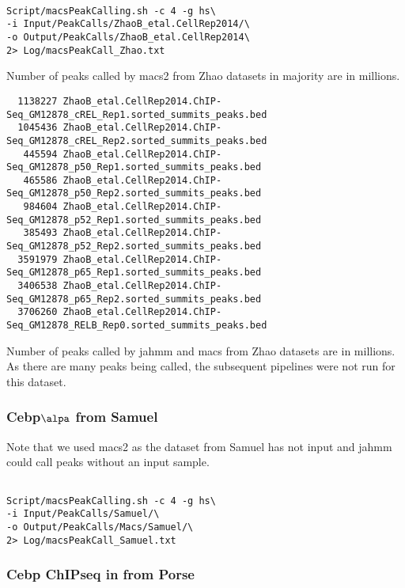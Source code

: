 \documentclass{article}\usepackage[]{graphicx}\usepackage[]{color}
\begin{document}
\begin{verbatim}

Script/macsPeakCalling.sh -c 4 -g hs\ 
-i Input/PeakCalls/ZhaoB_etal.CellRep2014/\
-o Output/PeakCalls/ZhaoB_etal.CellRep2014\ 
2> Log/macsPeakCall_Zhao.txt

\end{verbatim}

Number of peaks called by macs2 from Zhao datasets in majority are in millions. 
\begin{verbatim}
  1138227 ZhaoB_etal.CellRep2014.ChIP-Seq_GM12878_cREL_Rep1.sorted_summits_peaks.bed
  1045436 ZhaoB_etal.CellRep2014.ChIP-Seq_GM12878_cREL_Rep2.sorted_summits_peaks.bed
   445594 ZhaoB_etal.CellRep2014.ChIP-Seq_GM12878_p50_Rep1.sorted_summits_peaks.bed
   465586 ZhaoB_etal.CellRep2014.ChIP-Seq_GM12878_p50_Rep2.sorted_summits_peaks.bed
   984604 ZhaoB_etal.CellRep2014.ChIP-Seq_GM12878_p52_Rep1.sorted_summits_peaks.bed
   385493 ZhaoB_etal.CellRep2014.ChIP-Seq_GM12878_p52_Rep2.sorted_summits_peaks.bed
  3591979 ZhaoB_etal.CellRep2014.ChIP-Seq_GM12878_p65_Rep1.sorted_summits_peaks.bed
  3406538 ZhaoB_etal.CellRep2014.ChIP-Seq_GM12878_p65_Rep2.sorted_summits_peaks.bed
  3706260 ZhaoB_etal.CellRep2014.ChIP-Seq_GM12878_RELB_Rep0.sorted_summits_peaks.bed
\end{verbatim}

Number of peaks called by jahmm and macs from Zhao datasets are in millions.
As there are many peaks being called, the subsequent pipelines were not run for this dataset.

\subsubsection{Cebp$\alpa$ from Samuel}

Note that we used macs2 as the dataset from Samuel has not input and jahmm could call peaks without an input sample.

\begin{verbatim}

Script/macsPeakCalling.sh -c 4 -g hs\ 
-i Input/PeakCalls/Samuel/\ 
-o Output/PeakCalls/Macs/Samuel/\ 
2> Log/macsPeakCall_Samuel.txt

\end{verbatim}


\subsubsection{Cebp ChIPseq in from Porse}
\end{document}

